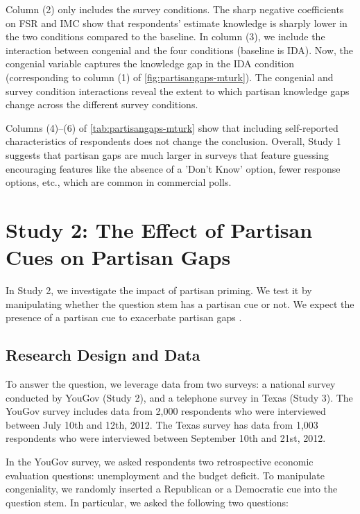 \documentclass[12pt, letterpaper]{article}
\begin{document}
Column (2) only includes the survey conditions. The sharp negative coefficients on FSR and IMC show that respondents' estimate knowledge is sharply lower in the two conditions compared to the baseline. In column (3), we include the interaction between congenial and the four conditions (baseline is IDA). Now, the congenial variable captures the knowledge gap in the IDA condition (corresponding to column (1) of \cref{fig:partisangaps-mturk}). The congenial and survey condition interactions reveal the extent to which partisan knowledge gaps change across the different survey conditions. 

Columns (4)--(6) of \cref{tab:partisangaps-mturk} show that including self-reported characteristics of respondents does not change the conclusion. Overall, Study 1 suggests that partisan gaps are much larger in surveys that feature guessing encouraging features like the absence of a 'Don't Know' option, fewer response options, etc., which are common in commercial polls.

\newpage
\section*{Study 2: The Effect of Partisan Cues on Partisan Gaps}\label{sec:partisan_cues}

In Study 2, we investigate the impact of partisan priming. We test it by manipulating whether the question stem has a partisan cue or not. We expect the presence of a partisan cue to exacerbate partisan gaps \citep{prior2015you}. 

\subsection*{Research Design and Data}\label{subsec:data2}

To answer the question, we leverage data from two surveys: a national survey conducted by YouGov (Study 2), and a telephone survey in Texas (Study 3). The YouGov survey includes data from 2,000 respondents who were interviewed between July 10th and 12th, 2012. The Texas survey has data from 1,003 respondents who were interviewed between September 10th and 21st, 2012.

In the YouGov survey, we asked respondents two retrospective economic evaluation questions: unemployment and the budget deficit. To manipulate congeniality, we randomly inserted a Republican or a Democratic cue into the question stem. In particular, we asked the following two questions:
\end{document}
